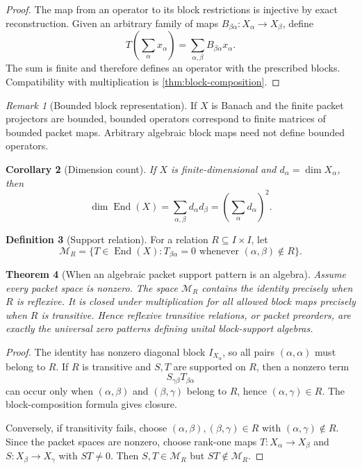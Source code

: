 \documentclass[11pt]{article}
\newtheorem{theorem}{Theorem}[section]
\newtheorem{corollary}[theorem]{Corollary}
\theoremstyle{definition}
\newtheorem{definition}[theorem]{Definition}
\theoremstyle{remark}
\newtheorem{remark}[theorem]{Remark}
\newcommand{\End}{\operatorname{End}}
\begin{document}
\begin{proof}
The map from an operator to its block restrictions is injective by exact reconstruction. Given an arbitrary family of maps $B_{\beta\alpha}:X_{\alpha}\to X_{\beta}$, define
\[
T\left(\sum_{\alpha}x_{\alpha}\right)
=
\sum_{\alpha,\beta}B_{\beta\alpha}x_{\alpha}.
\]
The sum is finite and therefore defines an operator with the prescribed blocks. Compatibility with multiplication is \cref{thm:block-composition}.
\end{proof}

\begin{remark}[Bounded block representation]
If $X$ is Banach and the finite packet projectors are bounded, bounded operators correspond to finite matrices of bounded packet maps. Arbitrary algebraic block maps need not define bounded operators.
\end{remark}

\begin{corollary}[Dimension count]
\label{cor:block-dimension-count}
If $X$ is finite-dimensional and $d_{\alpha}=\dim X_{\alpha}$, then
\[
\dim\End(X)
=
\sum_{\alpha,\beta}d_{\alpha}d_{\beta}
=
\left(\sum_{\alpha}d_{\alpha}\right)^2.
\]
\end{corollary}

\begin{definition}[Support relation]
For a relation $R\subseteq I\times I$, let
\[
\mathcal M_R
=
\{T\in\End(X):T_{\beta\alpha}=0
\text{ whenever }(\alpha,\beta)\notin R\}.
\]
\end{definition}

\begin{theorem}[When an algebraic packet support pattern is an algebra]
\label{thm:block-support-algebra}
Assume every packet space is nonzero. The space $\mathcal M_R$ contains the identity precisely when $R$ is reflexive. It is closed under multiplication for all allowed block maps precisely when $R$ is transitive. Hence reflexive transitive relations, or packet preorders, are exactly the universal zero patterns defining unital block-support algebras.
\end{theorem}

\begin{proof}
The identity has nonzero diagonal block $I_{X_{\alpha}}$, so all pairs $(\alpha,\alpha)$ must belong to $R$. If $R$ is transitive and $S,T$ are supported on $R$, then a nonzero term
\[
S_{\gamma\beta}T_{\beta\alpha}
\]
can occur only when $(\alpha,\beta)$ and $(\beta,\gamma)$ belong to $R$, hence $(\alpha,\gamma)\in R$. The block-composition formula gives closure.

Conversely, if transitivity fails, choose $(\alpha,\beta),(\beta,\gamma)\in R$ with $(\alpha,\gamma)\notin R$. Since the packet spaces are nonzero, choose rank-one maps $T:X_{\alpha}\to X_{\beta}$ and $S:X_{\beta}\to X_{\gamma}$ with $ST\ne0$. Then $S,T\in\mathcal M_R$ but $ST\notin\mathcal M_R$.
\end{proof}
\end{document}
